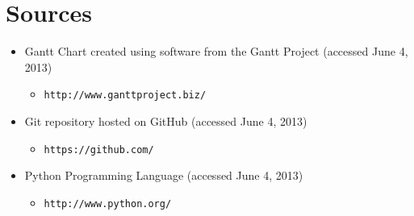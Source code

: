 \documentclass[11pt,english]{article}
\begin{document}
\section{Sources}
\begin{itemize}
\item Gantt Chart created using software from the Gantt Project
(accessed June 4, 2013) 
\begin{itemize}
\item \texttt{http://www.ganttproject.biz/}
\end{itemize}
\item Git repository hosted on GitHub
(accessed June 4, 2013) 
\begin{itemize}
\item \texttt{https://github.com/}
\end{itemize}
\item Python Programming Language
(accessed June 4, 2013) 
\begin{itemize}
\item \texttt{http://www.python.org/}
\end{itemize}
\end{itemize}
\end{document}
